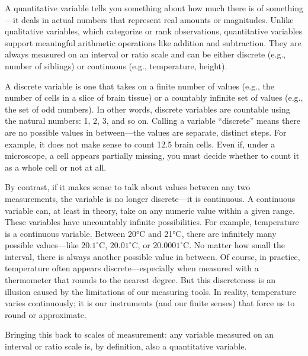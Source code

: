 A \gls{quantitative variable} tells you something about how much there is of something—it deals in actual numbers that represent real amounts or magnitudes. Unlike qualitative variables, which categorize or rank observations, quantitative variables support meaningful arithmetic operations like addition and subtraction. They are always measured on an interval or ratio scale and can be either discrete (e.g., number of siblings) or continuous (e.g., temperature, height).\label{sec:quant_var}



A \gls{discrete variable} is one that takes on a finite number of values (e.g., the number of cells in a slice of brain tissue) or a countably infinite set of values (e.g., the set of odd numbers). In other words, discrete variables are countable using the natural numbers: 1, 2, 3, and so on. Calling a variable ``discrete'' means there are no possible values in between—the values are separate, distinct steps. For example, it does not make sense to count 12.5 brain cells. Even if, under a microscope, a cell appears partially missing, you must decide whether to count it as a whole cell or not at all.

By contrast, if it makes sense to talk about values between any two measurements, the variable is no longer discrete—it is continuous. A \gls{continuous variable} can, at least in theory, take on any numeric value within a given range. These variables have uncountably infinite possibilities. For example, temperature is a continuous variable. Between 20°C and 21°C, there are infinitely many possible values—like $20.1^\circ$C, $20.01^\circ$C, or $20.0001^\circ$C. No matter how small the interval, there is always another possible value in between. Of course, in practice, temperature often appears discrete—especially when measured with a thermometer that rounds to the nearest degree. But this discreteness is an illusion caused by the limitations of our measuring tools. In reality, temperature varies continuously; it is our instruments (and our finite senses) that force us to round or approximate.

Bringing this back to scales of measurement: any variable measured on an interval or ratio scale is, by definition, also a quantitative variable.

